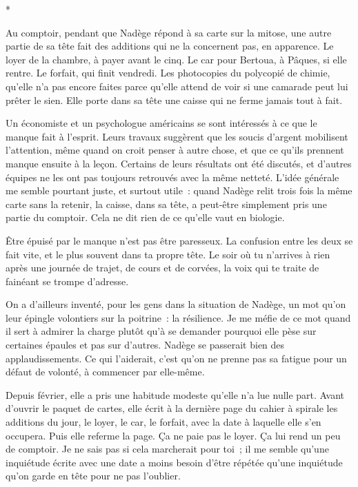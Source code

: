 \documentclass[10.5pt,twoside,openright]{book}
\newcommand{\asterisme}{\par\vspace{0.7em}\centerline{\color{gris}*\quad*\quad*}\vspace{0.7em}\par\noindent}
\begin{document}
\asterisme

Au comptoir, pendant que Nadège répond à sa carte sur la mitose, une autre partie de sa tête fait des additions qui ne la concernent pas, en apparence. Le loyer de la chambre, à payer avant le cinq. Le car pour Bertoua, à Pâques, si elle rentre. Le forfait, qui finit vendredi. Les photocopies du polycopié de chimie, qu’elle n’a pas encore faites parce qu’elle attend de voir si une camarade peut lui prêter le sien. Elle porte dans sa tête une caisse qui ne ferme jamais tout à fait.

Un économiste et un psychologue américains se sont intéressés à ce que le manque fait à l’esprit. Leurs travaux suggèrent que les soucis d’argent mobilisent l’attention, même quand on croit penser à autre chose, et que ce qu’ils prennent manque ensuite à la leçon. Certains de leurs résultats ont été discutés, et d’autres équipes ne les ont pas toujours retrouvés avec la même netteté. L’idée générale me semble pourtant juste, et surtout utile : quand Nadège relit trois fois la même carte sans la retenir, la caisse, dans sa tête, a peut-être simplement pris une partie du comptoir. Cela ne dit rien de ce qu’elle vaut en biologie.

Être épuisé par le manque n’est pas être paresseux. La confusion entre les deux se fait vite, et le plus souvent dans ta propre tête. Le soir où tu n’arrives à rien après une journée de trajet, de cours et de corvées, la voix qui te traite de fainéant se trompe d’adresse.

On a d’ailleurs inventé, pour les gens dans la situation de Nadège, un mot qu’on leur épingle volontiers sur la poitrine : la résilience. Je me méfie de ce mot quand il sert à admirer la charge plutôt qu’à se demander pourquoi elle pèse sur certaines épaules et pas sur d’autres. Nadège se passerait bien des applaudissements. Ce qui l’aiderait, c’est qu’on ne prenne pas sa fatigue pour un défaut de volonté, à commencer par elle-même.

Depuis février, elle a pris une habitude modeste qu’elle n’a lue nulle part. Avant d’ouvrir le paquet de cartes, elle écrit à la dernière page du cahier à spirale les additions du jour, le loyer, le car, le forfait, avec la date à laquelle elle s’en occupera. Puis elle referme la page. Ça ne paie pas le loyer. Ça lui rend un peu de comptoir. Je ne sais pas si cela marcherait pour toi ; il me semble qu’une inquiétude écrite avec une date a moins besoin d’être répétée qu’une inquiétude qu’on garde en tête pour ne pas l’oublier.
\end{document}
